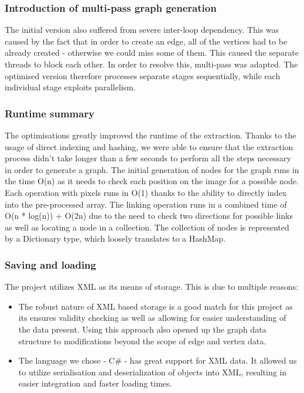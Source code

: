\documentclass[12pt,a4paper]{report}
\begin{document}
\subsubsection{Introduction of multi-pass graph generation}
The initial version also suffered from severe inter-loop dependency. This was caused by the fact that in order to create an edge, all of the vertices had to be already created - otherwise we could miss some of them. This caused the separate threads to block each other. In order to resolve this, multi-pass was adapted.  The optimised version therefore processes separate stages sequentially, while each individual stage exploits parallelism.

\subsubsection{Runtime summary}
The optimisations greatly improved the runtime of the extraction. Thanks to the usage of direct indexing and hashing, we were able to ensure that the extraction process didn't take longer than a few seconds to perform all the steps necessary in order to generate a graph. The initial generation of nodes for the graph runs in the time O(n) as it needs to check each position on the image for a possible node. Each operation with pixels runs in O(1) thanks to the ability to directly index into the pre-processed array. The linking operation runs in a combined time of O(n * log(n)) + O(2n) due to the need to check two directions for possible links as well as locating a node in a collection. The collection of nodes is represented by a Dictionary type, which loosely translates to a HashMap. 

\subsubsection{Saving and loading}
The project utilizes XML as its means of storage. This is due to multiple reasons:
	
\begin{itemize}

\item The robust nature of XML based storage is a good match for this project as its ensures validity checking as well as allowing for easier understanding of the data present. Using this approach also opened up the graph data structure to modifications beyond the scope of edge and vertex data. 
		
\item The language we chose - C\# - has great support for XML data. It allowed us to utilize serialisation and deserialization of objects into XML, resulting in easier integration and faster loading times.
\end{itemize}
\end{document}
